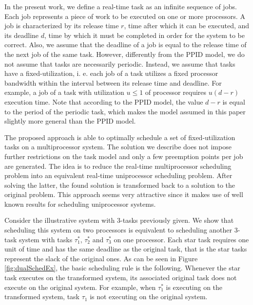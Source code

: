 \documentclass[twocolumn, compsocconf]{IEEEtran}
\renewcommand{\leq}{\leqslant}
\newcounter{proc}
\begin{document}
In the present work, we define a real-time task as an infinite sequence of
jobs. Each job represents a piece of work to be executed on one or more
processors. A job is characterized by its release time $r$, time after which it
can be executed, and its deadline $d$, time by which it must be completed in
order for the system to be correct. Also, we assume that the deadline of a job
is equal to the release time of the next job of the same task. However,
differently from the PPID model, we do not assume that tasks are necessarily
periodic. Instead, we assume that tasks have a fixed-utilization, i. e. each job
of a task utilizes a fixed processor bandwidth within the interval between its
release time and deadline. For example, a job of a task with utilization $u \leq
1$ of processor requires $u (d-r)$ execution time. Note that according to the
PPID model, the value $d-r$ is equal to the period of the periodic task, which
makes the model assumed in this paper slightly more general than the PPID model.

The proposed approach is able to optimally schedule a set of fixed-utilization
tasks on a multiprocessor system. The solution we describe does
not impose further restrictions on the task model and only a few preemption
points per job are generated. The idea is to reduce the real-time multiprocessor
scheduling problem into an equivalent real-time uniprocessor scheduling
problem. After solving the latter, the found solution is transformed back to a
solution to the original problem. This approach seems very attractive since it
makes use of well known results for scheduling uniprocessor systems.

Consider the illustrative system with 3-tasks previously given. We show that
scheduling this system on two processors is equivalent to scheduling another
3-task system with tasks $\tau_1^*$, $\tau_2^*$ and $\tau_3^*$ on one
processor. Each star task requires one unit of time and has the same deadline as
the original task, that is the star tasks represent the slack of the original
ones. As can be seen in Figure \ref{fig:dualSchedEx}, the basic scheduling rule
is the following. Whenever the star task executes on the transformed system, its
associated original task does not execute on the original system. For example,
when $\tau_1^*$ is executing on the transformed system, task $\tau_1$ is not
executing on the original system.
\end{document}
